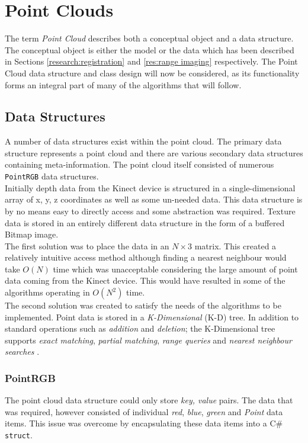 \section{Point Clouds}
The term \emph{Point Cloud} describes both a conceptual object and a data structure. The conceptual object is either the model or the data which has been described in Sections \ref{research:registration} and \ref{res:range imaging} respectively. The Point Cloud data structure and class design will now be considered, as its functionality forms an integral part of many of the algorithms that will follow. \\

\subsection{Data Structures}
A number of data structures exist within the point cloud. The primary data structure represents a point cloud and there are various secondary data structures containing meta-information. The point cloud itself consisted of numerous \texttt{PointRGB} data structures. \\

Initially depth data from the Kinect device is structured in a single-dimensional array of x, y, z coordinates as well as some un-needed data. This data structure is by no means easy to directly access and some abstraction was required. Texture data is stored in an entirely different data structure in the form of a buffered Bitmap image. \\

The first solution was to place the data in an $N \times 3$ matrix. This created a relatively intuitive access method although finding a nearest neighbour would take $O(N)$ time which was unacceptable considering the large amount of point data coming from the Kinect device. This would have resulted in some of the algorithms operating in $O(N^2)$ time. \\

The second solution was created to satisfy the needs of the algorithms to be implemented. Point data is stored in a \emph{K-Dimensional} (K-D) tree. In addition to standard operations such as \emph{addition} and \emph{deletion}; the K-Dimensional tree supports \emph{exact matching}, \emph{partial matching}, \emph{range queries} and \emph{nearest neighbour searches} \cite{bentley90}. \\

\subsubsection{PointRGB}
\label{pointrgb}
The point cloud data structure could only store \emph{key, value} pairs. The data that was required, however consisted of individual \emph{red}, \emph{blue}, \emph{green} and \emph{Point} data items. This issue was overcome by encapsulating these data items into a C# \texttt{struct}.\\ %

